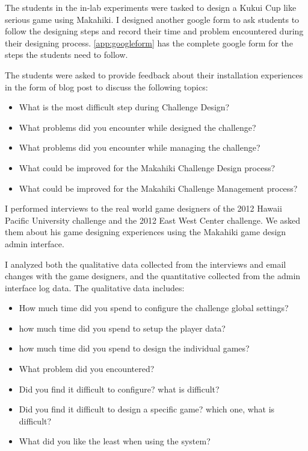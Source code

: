 The students in the in-lab experiments were tasked to design a Kukui Cup like serious game using Makahiki. I designed another google form to ask students to follow the designing steps and record their time and problem encountered during their designing process. \autoref{app:googleform} has the complete google form for the steps the students need to follow.

The students were asked to provide feedback about their installation experiences in the form of blog post to discuss the following topics:
\begin{itemize}
\item What is the most difficult step during Challenge Design?
\item What problems did you encounter while designed the challenge?
\item What problems did you encounter while managing the challenge?
\item What could be improved for the Makahiki Challenge Design process?
\item What could be improved for the Makahiki Challenge Management process?
\end{itemize}

I performed interviews to the real world game designers of the 2012 Hawaii Pacific University challenge and the 2012 East West Center challenge. We asked them about his game designing experiences using the Makahiki game design admin
 interface.

I analyzed both the qualitative data collected from the interviews and email changes with the game designers, and the quantitative collected from the admin interface log data. The qualitative data includes:
\begin{itemize}
    \item How much time did you spend to configure the challenge global settings?
    \item how much time did you spend to setup the player data?
    \item how much time did you spend to design the individual games?
    \item What problem did you encountered?
    \item Did you find it difficult to configure? what is difficult?
    \item Did you find it difficult to design a specific game? which one, what is difficult?
    \item What did you like the least when using the system?
\end{itemize}


